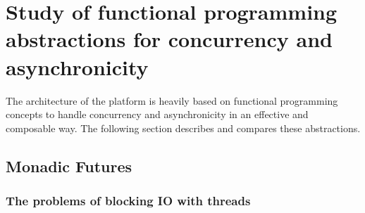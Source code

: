 \chapter{Study of functional programming abstractions for concurrency and asynchronicity}

The architecture of the platform is heavily based on functional programming concepts to handle concurrency and
asynchronicity in an effective and composable way. The following section describes and compares these abstractions.


\section{Monadic Futures}

\subsection{The problems of blocking IO with threads}

